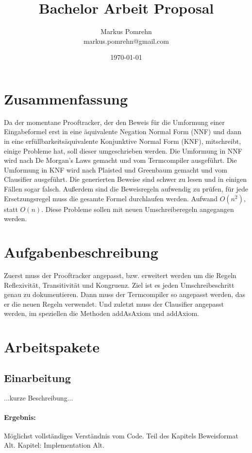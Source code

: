 \documentclass[a4paper]{article}
\title{Bachelor Arbeit Proposal}
\author{Markus Pomrehn\\{markus.pomrehn@gmail.com}}
\date{\today}
\begin{document}
\maketitle

\section{Zusammenfassung}

Da der momentane Prooftracker, der den Beweis für die Umformung einer Eingabeformel erst in eine äquivalente Negation Normal Form (NNF) und dann in eine erfüllbarkeitsäquivalente Konjunktive Normal Form (KNF), mitschreibt, einige Probleme hat, soll dieser umgeschrieben werden.
Die Umformung in NNF wird nach De Morgan's Laws gemacht und vom Termcompiler ausgeführt.
Die Umformung in KNF wird nach Plaisted und Greenbaum gemacht und vom Clausifier ausgeführt.
Die generierten Beweise sind schwer zu lesen und in einigen Fällen sogar falsch.
Außerdem sind die Beweisregeln aufwendig zu prüfen, für jede Ersetzungsregel muss die gesamte Formel durchlaufen werden.
Aufwand $O(n^2)$, statt $O(n)$. Diese Probleme sollen mit neuen Umschreiberegeln angegangen werden.

\section{Aufgabenbeschreibung}

Zuerst muss der Prooftracker angepasst, bzw. erweitert werden um die Regeln Reflexivität, Transitivität und Kongruenz.
Ziel ist es jeden Umschreibeschritt genau zu dokumentieren.
Dann muss der Termcompiler so angepasst werden, das er die neuen Regeln verwendet.
Und zuletzt muss der Clausifier angepasst werden, im speziellen die Methoden addAsAxiom und addAxiom.

\section{Arbeitspakete}

\subsection{Einarbeitung}

...kurze Beschreibung...

\paragraph{Ergebnis:}
Möglichst vollständiges Verständnis vom Code.
Teil des Kapitels Beweisformat Alt.
Kapitel: Implementation Alt.
\end{document}
